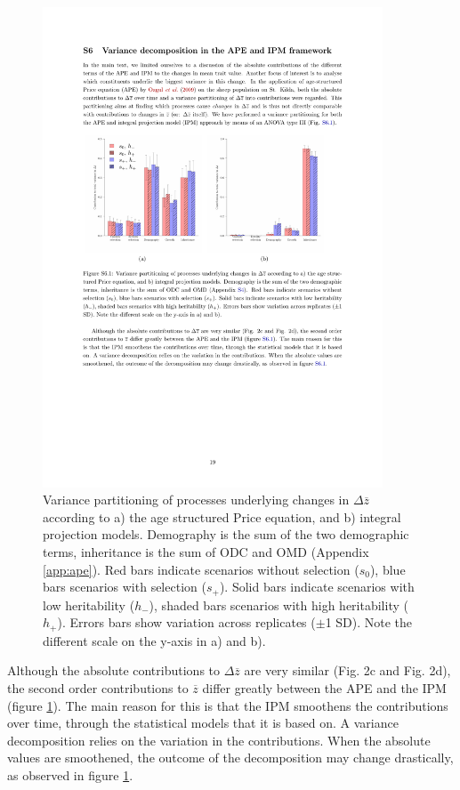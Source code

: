 \begin{figure}[H]
\centering
\includegraphics[width=0.9\textwidth]{Appendices/FigS5}
\caption{\footnotesize Variance partitioning of processes underlying changes in $\Delta \overline z$ according to a) the age structured Price equation, and b) integral projection models. Demography is the sum of the two demographic terms, inheritance is the sum of ODC and OMD (Appendix \ref{app:ape}). Red bars indicate scenarios without selection ($s_0$), blue bars scenarios with selection ($s_+$). Solid bars indicate scenarios with low heritability ($h_-$), shaded bars scenarios with high heritability ($h_+$). Errors bars show variation across replicates ($\pm$1 SD). Note the different scale on the y-axis in a) and b).}
\label{app:var:fig1}
\end{figure}

Although the absolute contributions to $\Delta \overline z$ are very similar (Fig. 2c and Fig. 2d), the second order contributions to $\overline z$ differ greatly between the APE and the IPM (figure \ref{app:var:fig1}). The main reason for this is that the IPM smoothens the contributions over time, through the statistical models that it is based on. A variance decomposition relies on the variation in the contributions. When the absolute values are smoothened, the outcome of the decomposition may change drastically, as observed in figure \ref{app:var:fig1}.

